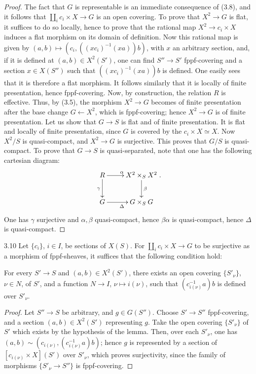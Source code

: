 \begin{proof}
The fact that \(G\) is
representable is an immediate
consequence of (3.8), and
it follows that
\(\coprod_i c_i\times X\to G\)
is an open covering.
To prove that \(X^2\to G\)
is flat, it suffices to
do so locally, hence to
prove that the rational
map \(X^2\to c_i\times X\)
induces a flat morphism
on its domain of definition.
Now this rational map
is given by
\((a,b)\mapsto(c_i,((xc_i)^{-1}(xa))b)\),
with \(x\) an arbitrary
section, and, if it is
defined at \((a,b)\in X^2(S')\),
one can find \(S''\to S'\)
fppf-covering and a section
\(x\in X(S'')\) such that
\(((xc_i)^{-1}(xa))b\)
is defined.
One easily sees that
it is therefore a flat
morphism.
It follows similarly
that it is locally of
finite presentation, hence
fppf-covering.
Now, by construction, the
relation \(R\) is effective.
Thus, by (3.5), the morphism
\(X^2\to G\) becomes of
finite presentation after
the base change \(G\leftarrow X^2\),
which is fppf-covering;
hence \(X^2\to G\)
is of finite presentation.
Let us show that \(G\to S\)
is flat and of finite
presentation.
It is flat and locally
of finite presentation,
since \(G\) is covered
by the \(c_i\times X\simeq X\).
Now \(X^2/S\) is quasi-compact,
and \(X^2\to G\) is surjective.
This proves that \(G/S\)
is quasi-compact.
To prove that \(G\to S\)
is quasi-separated, note
that one has the following
cartesian diagram:
\[
\xymatrix{
R\ar[r]^\alpha\ar[d]_\gamma & X^2\times_S X^2\ar[d]^\beta\\
G\ar[r]_\Delta & G\times_S G }.
\]
One has \(\gamma\) surjective
and \(\alpha,\beta\) quasi-compact,
hence \(\beta\alpha\) is
quasi-compact, hence \(\Delta\)
is quasi-compact.
\end{proof}
\begin{lemma}{3.10}\label{XVIII.3.10}
Let \(\{c_i\}\), \(i\in I\),
be sections of \(X(S)\).
For \(\coprod_i c_i\times X\to G\)
to be surjective as a
morphism of fppf-sheaves,
it suffices that the
following condition hold:

For every \(S'\to S\)
and \((a,b)\in X^2(S')\),
there exists an open covering
\(\{S'_\nu\}\), \(\nu\in N\),
of \(S'\), and a function
\(N\to I\), \(\nu\mapsto i(\nu)\),
such that \((c_{i(\nu)}^{-1}a)b\)
is defined over \(S'_\nu\).
\end{lemma}
\begin{proof}
Let \(S''\to S\) be arbitrary,
and \(g\in G(S'')\).
Choose \(S'\to S''\)
fppf-covering, and a
section \((a,b)\in X^2(S')\)
representing \(g\).
Take the open covering
\(\{S'_\nu\}\) of \(S'\)
which exists by the
hypothesis of the lemma.
Then, over each \(S'_\nu\),
one has
\((a,b)\sim(c_{i(\nu)},(c_{i(\nu)}^{-1}a)b)\);
hence \(g\) is represented
by a section of
\([c_{i(\nu)}\times X](S')\)
over \(S'_\nu\), which
proves surjectivity, since
the family of morphisms
\(\{S'_\nu\to S''\}\)
is fppf-covering.
\end{proof}
